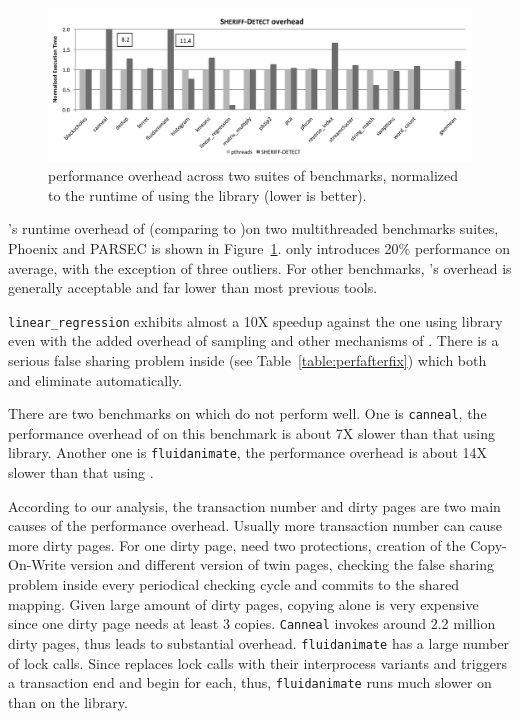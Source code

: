 \begin{figure}[!t]
\centering
\includegraphics[width=5in]{sheriff/figure/detectiveperf.pdf}
\caption{\sheriffdetect{} performance overhead across two suites of benchmarks, normalized to the runtime of using the \pthreads{} library (lower is better). \label{fig:overhead}}
\end{figure}


\SheriffDetect{}'s  runtime overhead of \sheriffdetect{} (comparing to \pthreads{})on two multithreaded benchmarks suites, Phoenix and PARSEC is shown in Figure~\ref{fig:overhead}.  \SheriffDetect{} only introduces 20\% performance on average, with the exception of three outliers. For other benchmarks, \SheriffDetect{}’s overhead is generally acceptable and far lower than most previous tools.

\texttt{linear\_regression} exhibits almost
a 10X speedup against the one using \pthreads{} library even with the added overhead of sampling and 
other mechanisms of \sheriffdetect{}.  There is a
serious false sharing problem inside (see
Table~\ref{table:perfafterfix}) which both \sheriffdetect{} and \sheriffprotect{} eliminate automatically. 

There are two benchmarks on which \sheriffdetect{} do not perform well. One is \texttt{canneal}, the performance overhead of \sheriffdetect{} on this benchmark is about 7X slower than that using \pthreads{} library. Another one is \texttt{fluidanimate}, the performance overhead is about 
14X slower than that using \pthreads{}.

According to our analysis, the transaction number and dirty pages are two main causes of the performance overhead. Usually more transaction number can cause more dirty pages.   
For one dirty page, \sheriffdetect{} need two protections, creation of the Copy-On-Write version and different version of twin pages, checking the false sharing problem inside every periodical checking cycle and  commits to the shared mapping. Given large amount of dirty pages, copying alone is very expensive since one dirty page needs at least 3 copies. 
\texttt{Canneal} invokes around 2.2 million dirty pages, thus  leads to substantial overhead.
\texttt{fluidanimate} has a large number of lock
calls. Since \SheriffDetect{} replaces lock calls with their interprocess variants and triggers a transaction end and begin for each, thus, \texttt{fluidanimate} runs much slower on \SheriffDetect{} than on the \pthreads{} library.
 
